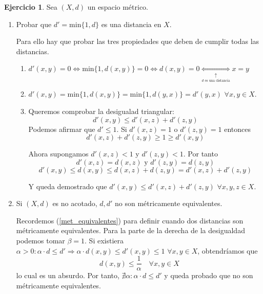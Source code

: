 \documentclass[a4paper, 12pt]{article}
\theoremstyle{definition}
\newtheorem{ej}{Ejercicio}
\begin{document}
\begin{ej}
Sea \((X,d)\) un espacio métrico.
\begin{enumerate}
	\item Probar que \(d' = \text{min}\{1,d\}\) es una distancia en \(X\).
	
Para ello hay que probar las tres propiedades que deben de cumplir todas las distancias.
	\begin{enumerate}
		\item \(d'(x,y) = 0 \Longleftrightarrow \text{min}\{1,d(x,y)\} = 0 \Longleftrightarrow d(x,y) = 0 \underset{\underset{d \text{ es una distancia}}{\uparrow}}{\Longleftrightarrow} x=y\)
		\item \(d'(x,y) = \text{min}\{1,d(x,y)\} = \text{min}\{1,d(y,x)\} = d'(y,x)\) \(\forall x,y \in X\).
		\item Queremos comprobar la desigualad triangular:
		\[
			d'(x,y) \leq d'(x,z) + d'(z,y)
		\] 
		Podemos afirmar que \(d' \leq 1\). Si \(d'(x,z)=1\) o \(d'(z,y)=1\) entonces
		\[
			d'(x,z) + d'(z,y) \geq 1 \geq d'(x,y)
		\]
		
		Ahora supongamos \(d'(x,z) <1 \) y \(d'(z,y) < 1\). Por tanto
		\[
		d'(x,z) = d(x,z) \text{ y } d'(z,y) = d(z,y)
		\]
		\[
			d'(x,y) \leq d(x,y) \leq d(x,z) + d(z,y) = d'(x,z) + d'(z,y)
		\]
		
		Y queda demostrado que \(d'(x,y) \leq d'(x,z) + d'(z,y)\) \(\forall x,y,z \in X\).
	\end{enumerate}
	
	\item Si \((X,d)\) es no acotado, \(d, d'\) no son métricamente equivalentes.
	
	Recordemos (\ref{met_equivalentes}) para definir cuando dos distancias son métricamente equivalentes. Para la parte de la derecha de la desigualdad podemos tomar \(\beta = 1\). Si existiera \(\alpha > 0 : \alpha \cdot d \leq d' \Rightarrow \alpha \cdot d(x,y) \leq d'(x,y) \leq 1\) \(\forall x,y \in X\), obtendríamos que
	\[
		d(x,y) \leq \frac{1}{\alpha} \quad \forall x,y \in X
	\]
	lo cual es un absurdo. Por tanto, \(\nexists \alpha : \alpha \cdot d \leq d'\) y queda probado que no son métricamente equivalentes.
\end{enumerate}
\end{ej}
\end{document}
